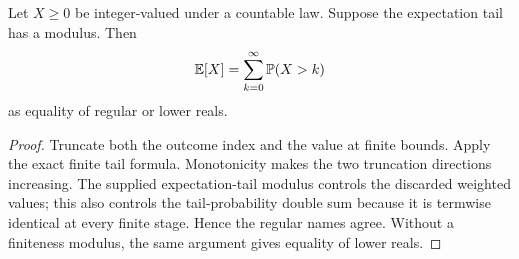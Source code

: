 \begin{corollary}\label{cor:countable-tail}
Let \(X\ge0\) be integer-valued under a countable law.  Suppose the expectation
tail has a modulus.  Then
\[
 \mathbb E[X]=\sum_{k=0}^{\infty}\mathbb P(X>k)
\]
as equality of regular or lower reals.
\end{corollary}

\begin{proof}
Truncate both the outcome index and the value at finite bounds.  Apply the exact
finite tail formula.  Monotonicity makes the two truncation directions
increasing.  The supplied expectation-tail modulus controls the discarded
weighted values; this also controls the tail-probability double sum because it
is termwise identical at every finite stage.  Hence the regular names agree.
Without a finiteness modulus, the same argument gives equality of lower reals.
\end{proof}

